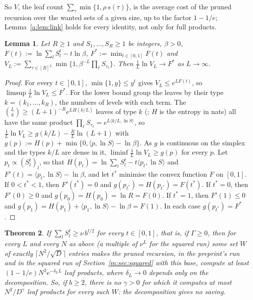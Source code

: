 \documentclass[11pt]{article}
\newtheorem{theorem}{Theorem}[section]
\newtheorem{lemma}[theorem]{Lemma}
\theoremstyle{definition}
\theoremstyle{remark}
\begin{document}
So $V$, the leaf count $\sum_\tau\min\{1,\rho\,s(\tau)\}$, is the average cost of the pruned recursion over the wanted sets of a given size, up to the factor $1-1/e$; Lemma~\ref{a:lem:link} holds for every identity, not only for full products.

\begin{lemma}\label{a:lem:types}
Let $R\ge1$ and $S_1,\dots,S_R\ge1$ be integers, $\beta>0$, $F(t):=\ln\sum_lS_l^t-t\ln\beta$, $F^*:=\min_{t\in[0,1]}F(t)$ and $V_L:=\sum_{\tau\in[R]^L}\min\{1,\beta^{-L}\prod_\ell S_{\tau_\ell}\}$. Then $\frac1L\ln V_L\to F^*$ as $L\to\infty$.
\end{lemma}

\begin{proof}
For every $t\in[0,1]$, $\min\{1,y\}\le y^t$ gives $V_L\le e^{LF(t)}$, so $\limsup\frac1L\ln V_L\le F^*$. For the lower bound group the leaves by their type $k=(k_1,\dots,k_R)$, the numbers of levels with each term. The $\binom L{k}\ge(L+1)^{-R}e^{LH(k/L)}$ leaves of type $k$ (\cite[Theorem 11.1.3]{CT06}; $H$ is the entropy in nats) all have the same product $\prod_\ell S_{\tau_\ell}=e^{L\langle k/L,\ln S\rangle}$, so $\frac1L\ln V_L\ge g(k/L)-\frac RL\ln(L+1)$ with $g(p):=H(p)+\min\{0,\langle p,\ln S\rangle-\ln\beta\}$. As $g$ is continuous on the simplex and the types $k/L$ are dense in it, $\liminf\frac1L\ln V_L\ge g(p)$ for every $p$. Let $p_t\propto(S_l^t)_l$, so that $H(p_t)=\ln\sum_lS_l^t-t\langle p_t,\ln S\rangle$ and $F'(t)=\langle p_t,\ln S\rangle-\ln\beta$, and let $t^*$ minimise the convex function $F$ on $[0,1]$. If $0<t^*<1$, then $F'(t^*)=0$ and $g(p_{t^*})=H(p_{t^*})=F(t^*)$. If $t^*=0$, then $F'(0)\ge0$ and $g(p_0)=H(p_0)=\ln R=F(0)$. If $t^*=1$, then $F'(1)\le0$ and $g(p_1)=H(p_1)+\langle p_1,\ln S\rangle-\ln\beta=F(1)$. In each case $g(p_{t^*})=F^*$.
\end{proof}

\begin{theorem}\label{a:thm:full}
If $\sum_lS_l^t\ge \nu\,b^{t/2}$ for every $t\in[0,1]$, that is, if $\Gamma\ge0$, then for every $L$ and every $N$ as above (a multiple of $\nu^L$ for the squared run) some set $W$ of exactly $\lceil N^2/\sqrt D\rceil$ entries makes the pruned recursion, in the preprint's run and in the squared run of Section~\ref{m:sec:squared} with this base, compute at least $(1-1/e)N^2e^{-\delta_LL}$ leaf products, where $\delta_L\to0$ depends only on the decomposition. So, if $b\ge2$, there is no $\gamma>0$ for which it computes at most $N^2/D^\gamma$ leaf products for every such $W$: the decomposition gives no saving.
\end{theorem}
\end{document}
